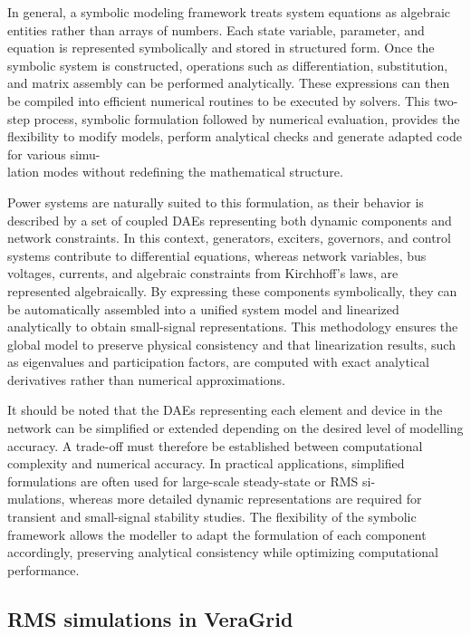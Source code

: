 In general, a symbolic modeling framework treats system equations as algebraic entities rather than arrays of numbers. Each state variable, parameter, and equation
is represented symbolically and stored in structured form. Once the symbolic system is constructed, operations such as differentiation, substitution, and matrix assembly
can be performed analytically. These expressions can then be compiled into efficient numerical routines to be executed by solvers. 
This two-step process, symbolic formulation followed by numerical evaluation, provides the flexibility to modify models, perform analytical checks
and generate adapted code for various simu-\\lation modes without redefining the mathematical structure.

Power systems are naturally suited to this formulation, as their behavior is described by a set of coupled DAEs representing both dynamic components and network constraints.
In this context, generators, exciters, governors, and control systems contribute to differential equations, whereas network variables, bus voltages, currents, and algebraic 
constraints from Kirchhoff's laws, are represented algebraically. By expressing these components symbolically, they can be automatically assembled into a unified 
system model and linearized analytically to obtain small-signal representations. This methodology ensures the global model to preserve physical consistency and that 
linearization results, such as eigenvalues and participation factors, are computed with exact analytical derivatives rather than numerical approximations.

It should be noted that the DAEs representing each element and device in the network can be simplified or extended depending on the desired level of modelling accuracy. 
A trade-off must therefore be established between computational complexity and numerical accuracy. In practical applications, simplified formulations are often used for 
large-scale steady-state or RMS si-\\mulations, whereas more detailed dynamic representations are required for transient and small-signal stability studies. The flexibility 
of the symbolic framework allows the modeller to adapt the formulation of each component accordingly, preserving analytical consistency while optimizing computational 
performance.

\subsection{RMS simulations in VeraGrid}

